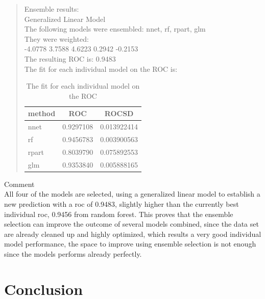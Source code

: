 \documentclass[12pt, a4paper, bibliography=totoc, english]{scrartcl}
\begin{document}
\begin{quote}
	Ensemble results:\\
	Generalized Linear Model\\
	The following models were ensembled: nnet, rf, rpart, glm \\
	They were weighted: \\
	-4.0778 3.7588 4.6223 0.2942 -0.2153\\
	The resulting ROC is: 0.9483\\
	The fit for each individual model on the ROC is: \\
	
	\begin{table}[htbp]
		\centering
		\begin{tabular}{|l|c|c|}\hline
			\bfseries method &\bfseries ROC &\bfseries ROCSD\\\hline\hline
			nnet & 0.9297108 & 0.013922414\\\hline
			rf & 0.9456783 & 0.003900563\\\hline
			rpart & 0.8039790 & 0.075892553\\\hline
			glm & 0.9353840 & 0.005888165\\\hline
			
			
		\end{tabular}
		\caption{The fit for each individual model on the ROC}
	\end{table}
\end{quote}

\textbullet\quad Comment\\
All four of the models are selected, using a generalized linear model to establish a new prediction with a roc of 0.9483, slightly higher than the currently best individual roc, 0.9456 from random forest. This proves that the ensemble selection can improve the outcome of several models combined, since the data set are already cleaned up and highly optimized, which results a very good individual model performance, the space to improve using ensemble selection is not enough since the models performs already perfectly.


\section{Conclusion}
\end{document}

